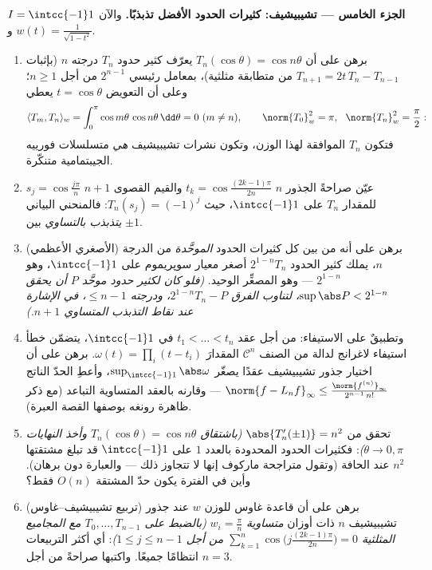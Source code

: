 \begin{problem}
\medskip
\noindent\textbf{الجزء الخامس --- تشيبيشيف: كثيرات الحدود
الأفضل تذبذبًا.} والآن $I = \intcc{-1}1$ و $w(t) =
\frac1{\sqrt{1 - t^2}}$.
\begin{enumerate}[resume]
  \item برهن على أن $T_n(\cos\theta) = \cos n\theta$ يعرّف كثير حدود $T_n$ درجته $n$
        (بإثبات $T_{n+1} =
        2t\,T_n - T_{n-1}$ من متطابقة مثلثية)، بمعامل رئيسي
        $2^{n-1}$ من أجل $n \geq 1$؛ وعلى أن التعويض
        $t = \cos\theta$ يعطي
        \[
        \langle T_m, T_n\rangle_w =
        \int_0^\pi\cos m\theta\,\cos n\theta\,\dd\theta
        = 0 \ (m \neq n), \qquad
        \norm{T_0}_w^2 = \pi,\ \ \norm{T_n}_w^2 = \frac\pi2 :
        \]
        فتكون $T_n$  الموافقة لهذا
        الوزن، وتكون نشرات تشيبيشيف \emph{هي} متسلسلات فورييه
        الجيبتمامية متنكّرة.
  \item عيّن صراحةً الجذور $n$ $t_k =
        \cos\frac{(2k-1)\pi}{2n}$ والقيم القصوى $n + 1$
        $s_j = \cos\frac{j\pi}n$ للمقدار $T_n$ على $\intcc{-1}1$، حيث $T_n(s_j) = (-1)^j$:
        فالمنحني البياني \emph{يتذبذب بالتساوي} بين $\pm1$.
  \item (الأصغري الأعظمي) برهن على أنه من بين كل كثيرات
        الحدود \emph{الموحَّدة} من الدرجة $n$، يملك كثير
        الحدود $2^{1-n}T_n$ أصغر معيار سوپريموم على
        $\intcc{-1}1$، وهو $2^{1-n}$ --- وهو المصغِّر الوحيد.
        \emph{(فلو كان لكثير حدود موحَّد $P$ أن يحقق $\sup\abs P < 2^{1-n}$،
        لتناوب الفرق $2^{1-n}T_n -
        P$، ودرجته $\leq n-1$، في الإشارة
        عند نقاط التذبذب المتساوي $n+1$.)}
  \item وتطبيقٌ على الاستيفاء: من أجل عقد $t_1 < \dots
        < t_n$ في
        $\intcc{-1}1$، يتضمّن خطأ استيفاء لاغرانج لدالة من
        الصنف $\mathcal C^n$ المقدارَ $\omega(t) = \prod_i(t - t_i)$. برهن على أن
        اختيار جذور تشيبيشيف عقدًا يصغّر $\sup_{\intcc{-1}1}\abs\omega$، وأعطِ الحدّ
        الناتج $\norm{f -
        L_nf}_\infty \leq \frac{\norm{f^{(n)}}_\infty}
        {2^{n-1}\,n!}$ --- وقارنه بالعقد المتساوية التباعد
        (مع ذكر ظاهرة رونغه بوصفها القصة العبرة).
  \item تحقق من $\abs{T_n'(\pm1)} = n^2$ \emph{(باشتقاق $T_n(\cos\theta) = \cos n\theta$ وأخذ النهايات
        $\theta \to 0, \pi$)}: فكثيرات الحدود المحدودة بالعدد $1$ على
        $\intcc{-1}1$ قد تبلغ مشتقتها $n^2$ عند الحافة (وتقول
        متراجحة ماركوف إنها لا تتجاوز ذلك --- والعبارة دون
        برهان). وأين في الفترة يكون حدّ المشتقة $O(n)$ فقط؟
  \item (تربيع تشيبيشيف--غاوس) برهن على أن قاعدة غاوس للوزن
        $w$ عند جذور تشيبيشيف $n$ ذات أوزان \emph{متساوية}
        $w_i = \frac\pi n$ \emph{(بالضبط على $T_0, \dots, T_{n-1}$ مع المجاميع
        المثلثية $\sum_{k=1}^n\cos\bigl(j\tfrac{(2k-1)\pi}{2n}\bigr) =
        0$ من أجل $1 \leq j \leq n - 1$)}: أي أكثر التربيعات
        انتظامًا جميعًا. واكتبها صراحةً من أجل $n = 3$.
\end{enumerate}


\end{problem}
